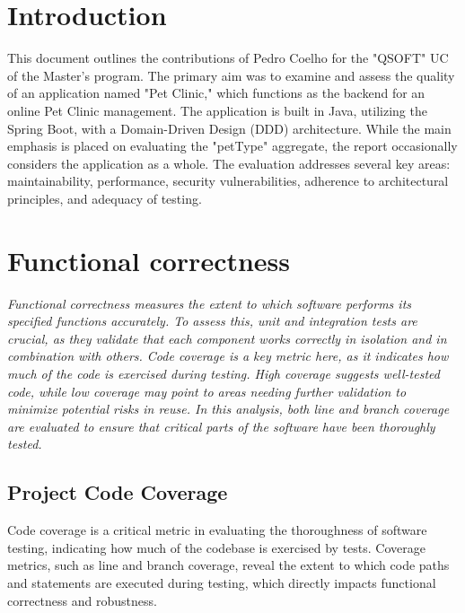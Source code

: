 \documentclass[a4paper,11pt,openright,BCOR=15mm]{scrbook}
\begin{document}
	\cleardoublepage
	

	
	
	
	\tableofcontents
	\listoffigures
	
	
	
	
	\mainmatter 
	
	

	\chapter{Introduction}
	
This document outlines the contributions of Pedro Coelho for the "QSOFT" UC of the Master’s program. The primary aim was to examine and assess the quality of an application named "Pet Clinic," which functions as the backend for an online Pet Clinic management. The application is built in Java, utilizing the Spring Boot, with a Domain-Driven Design (DDD) architecture. While the main emphasis is placed on evaluating the "petType" aggregate, the report occasionally considers the application as a whole. The evaluation addresses several key areas: maintainability, performance, security vulnerabilities, adherence to architectural principles, and adequacy of testing.

	
		\chapter{Functional correctness}

		\textit{	Functional correctness measures the extent to which software performs its specified functions accurately. To assess this, unit and integration tests are crucial, as they validate that each component works correctly in isolation and in combination with others. Code coverage is a key metric here, as it indicates how much of the code is exercised during testing. High coverage suggests well-tested code, while low coverage may point to areas needing further validation to minimize potential risks in reuse. In this analysis, both line and branch coverage are evaluated to ensure that critical parts of the software have been thoroughly tested.}
		
		\section{Project Code Coverage}
		Code coverage is a critical metric in evaluating the thoroughness of software testing, indicating how much of the codebase is exercised by tests. Coverage metrics, such as line and branch coverage, reveal the extent to which code paths and statements are executed during testing, which directly impacts functional correctness and robustness.
		\vspace{1em}
		
\end{document}

